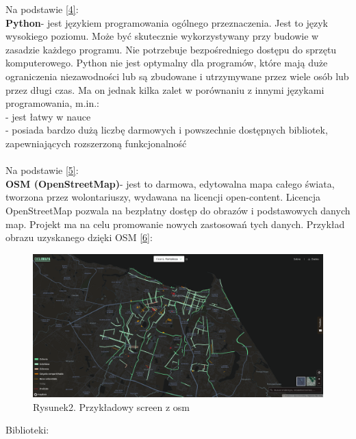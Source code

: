\documentclass[a4paper, twoside, 12pt, justified]{article}
\begin{document}
	 Na podstawie \hyperlink{python}{[4]}:\\
	 \textbf{Python}- jest językiem programowania ogólnego przeznaczenia. Jest to język wysokiego poziomu. Może być skutecznie wykorzystywany przy budowie w zasadzie każdego programu. Nie potrzebuje bezpośredniego dostępu do sprzętu komputerowego. Python nie jest optymalny dla programów, które mają duże ograniczenia niezawodności lub są zbudowane i utrzymywane przez wiele osób lub przez długi czas. Ma on jednak kilka zalet w porównaniu z innymi językami programowania, m.in.:\\
	 - jest łatwy w nauce\\ 
	 - posiada bardzo dużą liczbę darmowych i powszechnie dostępnych bibliotek, zapewniających rozszerzoną funkcjonalność\\ \\
	 
	 Na podstawie \hyperlink{osm}{[5]}:\\
	 \textbf{OSM (OpenStreetMap)}- jest to darmowa, edytowalna mapa całego świata, tworzona przez wolontariuszy, wydawana na licencji open-content. Licencja OpenStreetMap pozwala na bezpłatny dostęp do obrazów i podstawowych danych map. Projekt ma na celu promowanie nowych zastosowań tych danych. Przykład obrazu uzyskanego dzięki OSM \hyperlink{osm_example}{[6]}: \\
	 
 	\begin{figure}[h]
 	\includegraphics[scale=0.23]{osm_example}
 	\centering
 	\\
 	{Rysunek2. Przykładowy screen z osm}
	\end{figure}
	 
	 Biblioteki: \\
	 
	 
	 
	 
	
	
	
\end{document}
